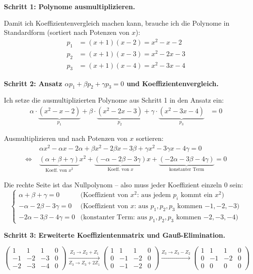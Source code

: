 \documentclass[a4paper,12pt]{article}
\begin{document}
\medskip

\textbf{Schritt 1: Polynome ausmultiplizieren.}

Damit ich Koeffizientenvergleich machen kann, brauche ich die Polynome in
Standardform (sortiert nach Potenzen von $x$):
\begin{align*}
p_1 &= (x+1)(x-2) = x^2 - x - 2 \\
p_2 &= (x+1)(x-3) = x^2 - 2x - 3 \\
p_3 &= (x+1)(x-4) = x^2 - 3x - 4
\end{align*}

\textbf{Schritt 2: Ansatz $\alpha p_1 + \beta p_2 + \gamma p_3 = 0$ und Koeffizientenvergleich.}

Ich setze die ausmultiplizierten Polynome aus Schritt 1 in den Ansatz ein:
\begin{align*}
\alpha \cdot \underbrace{(x^2 - x - 2)}_{p_1}
+ \beta \cdot \underbrace{(x^2 - 2x - 3)}_{p_2}
+ \gamma \cdot \underbrace{(x^2 - 3x - 4)}_{p_3} &= 0
\end{align*}

Ausmultiplizieren und nach Potenzen von $x$ sortieren:
\begin{align*}
&\alpha x^2 - \alpha x - 2\alpha + \beta x^2 - 2\beta x - 3\beta + \gamma x^2 - 3\gamma x - 4\gamma = 0 \\
\iff\;& \underbrace{(\alpha + \beta + \gamma)}_{\text{Koeff.\ von } x^2} x^2
+ \underbrace{(-\alpha - 2\beta - 3\gamma)}_{\text{Koeff.\ von } x} x
+ \underbrace{(-2\alpha - 3\beta - 4\gamma)}_{\text{konstanter Term}} = 0
\end{align*}

Die rechte Seite ist das Nullpolynom -- also muss jeder Koeffizient einzeln $0$ sein:
\[
\begin{cases}
\alpha + \beta + \gamma = 0 & \text{(Koeffizient von $x^2$: aus jedem $p_i$ kommt ein $x^2$)} \\
-\alpha - 2\beta - 3\gamma = 0 & \text{(Koeffizient von $x$: aus $p_1, p_2, p_3$ kommen $-1, -2, -3$)} \\
-2\alpha - 3\beta - 4\gamma = 0 & \text{(konstanter Term: aus $p_1, p_2, p_3$ kommen $-2, -3, -4$)}
\end{cases}
\]

\textbf{Schritt 3: Erweiterte Koeffizientenmatrix und Gau\ss-Elimination.}

\[
\left(\begin{array}{ccc|c}
1 & 1 & 1 & 0 \\
-1 & -2 & -3 & 0 \\
-2 & -3 & -4 & 0
\end{array}\right)
\xrightarrow[Z_3 \to Z_3 + 2Z_1]{Z_2 \to Z_2 + Z_1}
\left(\begin{array}{ccc|c}
1 & 1 & 1 & 0 \\
0 & -1 & -2 & 0 \\
0 & -1 & -2 & 0
\end{array}\right)
\xrightarrow{Z_3 \to Z_3 - Z_2}
\left(\begin{array}{ccc|c}
1 & 1 & 1 & 0 \\
0 & -1 & -2 & 0 \\
0 & 0 & 0 & 0
\end{array}\right)
\]
\end{document}
